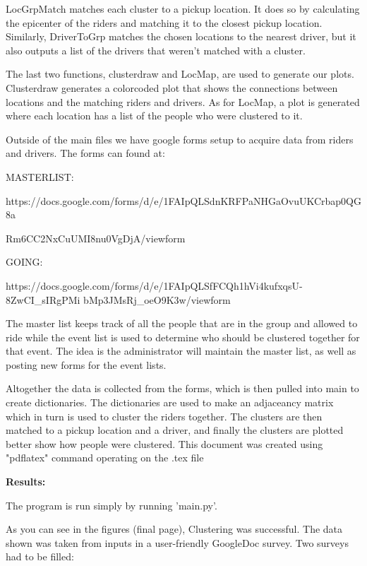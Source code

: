 \documentclass[11pt]{article}
\begin{document}
\hfill \break
LocGrpMatch matches each cluster to a pickup location. It does so by calculating the epicenter
of the riders and matching it to the closest pickup location. Similarly, DriverToGrp matches 
the chosen locations to the nearest driver, but it also outputs a list of the drivers that 
weren't matched with a cluster.

\hfill \break
The last two functions, clusterdraw and LocMap, are used to generate our plots. Clusterdraw 
generates a colorcoded plot that shows the connections between locations and the matching 
riders and drivers. As for LocMap, a plot is generated where each location has a list of the 
people who were clustered to it.

\hfill \break
Outside of the main files we have google forms setup to acquire data from riders and drivers.
The forms can found at:

\hfill \break
\hfill \break
\hfill \break
\hfill \break
\hfill \break
MASTERLIST:

https://docs.google.com/forms/d/e/1FAIpQLSdnKRFPaNHGaOvuUKCrbap0QG8a

Rm6CC2NxCuUMI8nu0VgDjA/viewform


\hfill \break
GOING:

https://docs.google.com/forms/d/e/1FAIpQLSfFCQh1hVi4kufxqsU-8ZwCI\_sIRgPMi
bMp3JMsRj\_oeO9K3w/viewform

\hfill \break
The master list keeps track of all the people that are in the group and allowed to ride
while the event list is used to determine who should be clustered together for that event. The 
idea is the administrator will maintain the master list, as well as posting new forms for the 
event lists.

\hfill \break
Altogether the data is collected from the forms, which is then pulled into main to create 
dictionaries. The dictionaries are used to make an adjaceancy matrix which in turn is used to 
cluster the riders together. The clusters are then matched to a pickup location and a driver,
and finally the clusters are plotted better show how people were clustered.
This document was created using "pdflatex" command operating on the .tex file




\hfill \break
\textbf{Results:}

\hfill \break
The program is run simply by running 'main.py'.

\hfill \break
As you can see in the figures (final page), Clustering was successful.
The data shown was taken from inputs in a user-friendly GoogleDoc survey.
Two surveys had to be filled:
\end{document}
